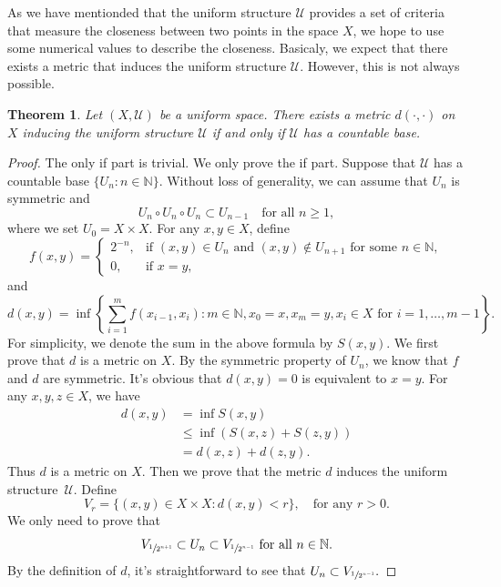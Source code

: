 \documentclass[12pt,a4paper,draft]{article}  %
\newtheorem{theorem}{Theorem}[section]
\theoremstyle{definition}
\numberwithin{equation}{section}
\newcommand{\NN}{\mathbb{N}}
\begin{document}
As we have mentionded that the uniform structure $\mathcal{U}$ provides a set of criteria that measure the closeness between two points in the space $X$,
we hope to use some numerical values to describe the closeness.
Basicaly, we expect that there exists a metric that induces the uniform structure $\mathcal{U}$.
However, this is not always possible.
\begin{theorem} \label{thm2.2}
    Let $(X,\mathcal{U})$ be a uniform space. 
    There exists a metric $d(\cdot,\cdot)$ on $X$ inducing the uniform structure $\mathcal{U}$ if and only if 
    $\mathcal{U}$ has a countable base.
\end{theorem}
\begin{proof}
    The only if part is trivial. We only prove the if part.
    Suppose that $\mathcal{U}$ has a countable base $\{U_n:n \in \NN\}$.
    Without loss of generality, we can assume that $U_n$ is symmetric and
    $$ U_n \circ U_n \circ U_n \subset U_{n-1} \quad \text{for all } n \geq 1, $$
    where we set $U_0 = X \times X$.
    For any $x,y \in X$, define
    $$ f(x,y)=
    \begin{cases}
        2^{-n}, & \text{if } (x,y) \in U_n \text{ and } (x,y) \notin U_{n+1} \text{ for some } n \in \NN, \\
        0, & \text{if } x=y,
    \end{cases}  $$
    and 
    $$ d(x,y) = \inf\left\{\sum_{i=1}^m f(x_{i-1},x_i): m \in \NN, x_0=x, x_m=y, x_i \in X \text{ for } i=1,\ldots,m-1 \right\}. $$
    For simplicity, we denote the sum in the above formula by $S(x,y)$.
    We first prove that $d$ is a metric on $X$.
    By the symmetric property of $U_n$, we know that $f$ and $d$ are symmetric.
    It's obvious that $d(x,y)=0$ is equivalent to $x=y$.
    For any $x,y,z \in X$, we have
    \begin{align}
        d(x,y) & = \inf S(x,y) \nonumber \\
        & \leq \inf(S(x,z)+S(z,y)) \nonumber \\
        & = d(x,z) + d(z,y). \nonumber
    \end{align}
    Thus $d$ is a metric on $X$.
    Then we prove that the metric $d$ induces the uniform structure~$\mathcal{U}$.
    Define 
    $$ V_r = \{(x,y) \in X \times X: d(x,y) < r\}, \quad \text{for any } r > 0. $$
    We only need to prove that 
    $$ V_{\sfrac{1}{2^{n+1}}} \subset U_n \subset V_{\sfrac{1}{2^{n-1}}} \text{ for all } n \in \NN. $$
    By the definition of $d$, it's straightforward to see that
    $ U_n \subset V_{\sfrac{1}{2^{n-1}}}. $

\end{proof}
\end{document}
